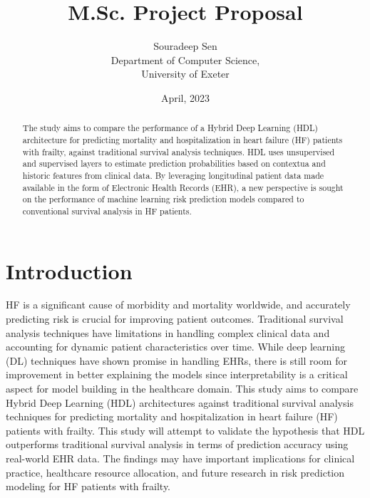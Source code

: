 \documentclass[%
 reprint,
 amsmath,amssymb,
 aps,
 nofootinbib,
]{revtex4-2}
\theoremstyle{definition}
\begin{document}

\title{M.Sc. Project Proposal}%
\author{Souradeep Sen \\
	 \small Department of Computer Science, \\ 
	 \small University of Exeter
	}

\date{April, 2023}%

\begin{abstract}
The study aims to compare the performance of a Hybrid Deep Learning (HDL) architecture for predicting mortality and hospitalization in heart failure (HF) patients with frailty, against traditional survival analysis techniques. HDL uses unsupervised and supervised layers to estimate prediction probabilities based on contextua and historic features from clinical data. By leveraging longitudinal patient data made available in the form of Electronic Health Records (EHR), a new perspective is sought on the performance of machine learning risk prediction models compared to conventional survival analysis in HF patients.
\end{abstract}

\maketitle

\section{\label{intro}Introduction}
HF is a significant cause of morbidity and mortality worldwide, and accurately predicting risk is crucial for improving patient outcomes. Traditional survival analysis techniques have limitations in handling complex clinical data and accounting for dynamic patient characteristics over time. While deep learning (DL) techniques have shown promise in handling EHRs, there is still room for improvement in better explaining the models since interpretability is a critical aspect for model building in the healthcare domain. This study aims to compare Hybrid Deep Learning (HDL) architectures against traditional survival analysis techniques for predicting mortality and hospitalization in heart failure (HF) patients with frailty. This study will attempt to validate the hypothesis that HDL outperforms traditional survival analysis in terms of prediction accuracy using real-world EHR data. The findings may have important implications for clinical practice, healthcare resource allocation, and future research in risk prediction modeling for HF patients with frailty.
\end{document}
